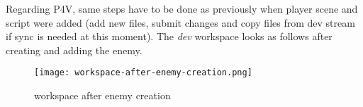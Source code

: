 Regarding P4V, same steps have to be done as previously when player scene and script were added (add new files,
submit changes and copy files from dev stream if sync is needed at this moment). The \textit{dev} workspace looks as 
follows after creating and adding the enemy.
\begin{figure}[H]
  \centering
  \texttt{[image: workspace-after-enemy-creation.png]}
    \caption{workspace after enemy creation}
    \label{fig:workspace-after-enemy-creation}
\end{figure}